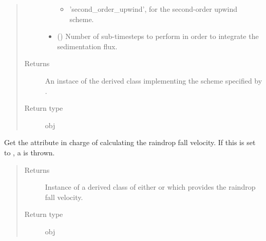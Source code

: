 \documentclass[letterpaper,10pt,english]{sphinxmanual}
\begin{document}
\begin{fulllineitems}
\begin{fulllineitems}
\begin{quote}
\begin{description}
\begin{itemize}
\begin{itemize}
\item {} 
’second\_order\_upwind’, for the second-order upwind scheme.

\end{itemize}


\item {} 
 () \textendash{} Number of sub-timesteps to perform in order to integrate the sedimentation flux.

\end{itemize}

\item[{Returns}] \leavevmode
An instace of the derived class implementing the scheme specified by .

\item[{Return type}] \leavevmode
obj

\end{description}\end{quote}

\end{fulllineitems}


\begin{fulllineitems}
\label{\detokenize{api:tasmania.dycore.prognostic_isentropic.PrognosticIsentropic.microphysics}}
Get the attribute in charge of calculating the raindrop fall velocity.
If this is set to , a  is thrown.
\begin{quote}\begin{description}
\item[{Returns}] \leavevmode
Instance of a derived class of either
 or
{\hyperref[\detokenize{api:tasmania.parameterizations.adjustments.AdjustmentMicrophysics}]{}}
which provides the raindrop fall velocity.

\item[{Return type}] \leavevmode
obj

\end{description}\end{quote}

\end{fulllineitems}



\end{fulllineitems}
\end{document}
